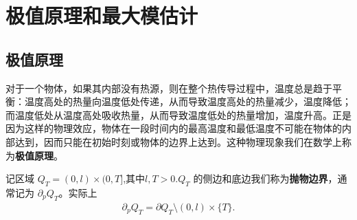 \documentclass[../../main.tex]{subfiles}%
\begin{document}
\section{极值原理和最大模估计}

\subsection{极值原理}

对于一个物体，如果其内部没有热源，则在整个热传导过程中，温度总是趋于平衡：温度高处的热量向温度低处传递，从而导致温度高处的热量减少，温度降低；而温度低处从温度高处吸收热量，从而导致温度低处的热量增加，温度升高。正是因为这样的物理效应，物体在一段时间内的最高温度和最低温度不可能在物体的内部达到，因而只能在初始时刻或物体的边界上达到。这种物理现象我们在数学上称为\textbf{极值原理}。

\begin{definition}
记区域 $Q_T=(0,l)\times(0,T]$,其中$l,T>0$.$Q_T$ 的侧边和底边我们称为\textbf{抛物边界}，通常记为 $\partial_p Q_T$。实际上
\begin{align*}
\partial_p Q_T=\partial Q_T\setminus(0,l)\times\{T\}.
\end{align*}
\end{definition}
\end{document}
